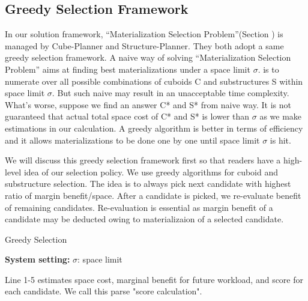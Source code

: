 \subsection{Greedy Selection Framework}

 In our solution framework, ``Materialization Selection Problem''(Section \label{sec:Problem Definition}) is managed by Cube-Planner and Structure-Planner. They both adopt a same greedy selection framework. A naive way of solving ``Materialization Selection Problem'' aims at finding best materializations under a space limit $\sigma$.  is to numerate over all possible combinations of cuboids C and substructures S within space limit $\sigma$. But such naive may result in an unacceptable time complexity. What's worse, suppose we find an answer C* and S* from naive way. It is not guaranteed that actual total space cost of C* and S* is lower than $\sigma$ as we make estimations in our calculation. A greedy algorithm is better in terms of efficiency and it allows materializations to be done one by one until space limit $\sigma$ is hit.
 
 We will discuss this greedy selection framework first so that readers have a high-level idea of our selection policy. We use greedy algorithms for cuboid and substructure selection. The idea is to always pick next candidate with highest ratio of margin benefit/space. After a candidate is picked, we re-evaluate benefit of remaining candidates. Re-evaluation is essential as margin benefit of a candidate may be deducted owing to materializaion of a selected candidate. 


\begin{algorithm}[H]
	\caption{Greedy Selection}
	\LinesNumbered  
	\textbf{System setting:} $\sigma$: space limit\\ 
	
\end{algorithm}

Line 1-5 estimates space cost, marginal benefit for future workload, and score for each candidate. We call this parse  "score calculation".

